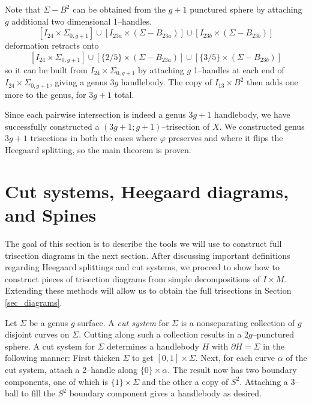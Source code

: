 \documentclass[12pt]{amsart}
\newcommand{\del}{\partial }
\theoremstyle{definition}
\theoremstyle{remark}
\begin{document}
Note that $\Sigma - B^2$ can be obtained from the $g+1$ punctured sphere by attaching $g$ additional two dimensional 1--handles.
$$\left[ I_{24} \times \Sigma_{0,g+1} \right] \cup \left[ I_{23a} \times (\Sigma - B_{23a}) \right] \cup \left[ I_{23b} \times (\Sigma - B_{23b}) \right]$$ deformation retracts onto $$\left[ I_{24} \times \Sigma_{0,g+1} \right] \cup \left[ \{2/5\} \times (\Sigma - B_{23a}) \right] \cup \left[ \{3/5\} \times (\Sigma - B_{23b}) \right]$$ so it can be built from $I_{24} \times \Sigma_{0,g+1}$ by attaching $g$ 1--handles at each end of $I_{24} \times \Sigma_{0,g+1}$, giving a genus $3g$ handlebody.
The copy of $I_{13} \times B^2$ then adds one more to the genus, for $3g+1$ total.


Since each pairwise intersection is indeed a genus $3g+1$ handlebody, we have successfully constructed a $(3g+1;g+1)$--trisection of $X$.
We constructed genus $3g+1$ trisections in both the cases where $\varphi$ preserves and where it flips the Heegaard splitting, so the main theorem is proven.

\section{Cut systems, Heegaard diagrams, and Spines}
\label{sec_cutsystems}

The goal of this section is to describe the tools we will use to construct full trisection diagrams in the next section.
After discussing important definitions regarding Heegaard splittings and cut systems, we proceed to show how to construct pieces of trisection diagrams from simple decompositions of $I \times M$.
Extending these methods will allow us to obtain the full trisections in Section \ref{sec_diagrams}.

Let $\Sigma$ be a genus $g$ surface.
A \emph{cut system} for $\Sigma$ is a nonseparating collection of $g$ disjoint curves on $\Sigma$.
Cutting along such a collection results in a $2g$--punctured sphere.
A cut system for $\Sigma$ determines a handlebody $H$ with $\del H = \Sigma$ in the following manner:  First thicken $\Sigma$ to get $[0,1] \times \Sigma$.
Next, for each curve $\alpha$ of the cut system, attach a 2--handle along $\{0\} \times \alpha$.
The result now has two boundary components, one of which is $\{1\} \times \Sigma$ and the other a copy of $S^2$.
Attaching a 3--ball to fill the $S^2$ boundary component gives a handlebody as desired.
\end{document}
